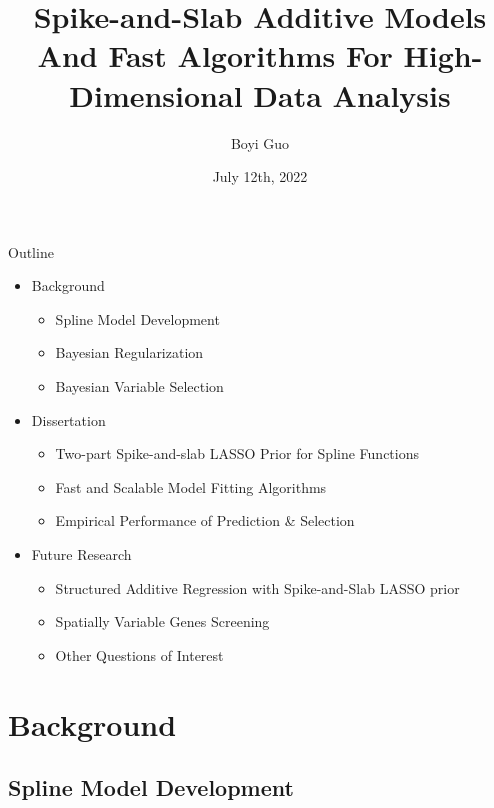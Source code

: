 \documentclass[
  ignorenonframetext,
  aspectratio=169]{beamer}
\title{Spike-and-Slab Additive Models And Fast Algorithms For
High-Dimensional Data Analysis}
\author{Boyi Guo}
\date{July 12th, 2022}
\institute{Department of Biostatistics\\
University of Alabama at Birmingham}
\providecommand{\tightlist}{%
  \setlength{\itemsep}{0pt}\setlength{\parskip}{0pt}}
\begin{document}
\frame{\titlepage}


\begin{frame}{Outline}
\begin{itemize}
\tightlist
\item
  Background

  \begin{itemize}
  \tightlist
  \item
    Spline Model Development
  \item
    Bayesian Regularization
  \item
    Bayesian Variable Selection
  \end{itemize}
\item
  Dissertation

  \begin{itemize}
  \tightlist
  \item
    Two-part Spike-and-slab LASSO Prior for Spline Functions
  \item
    Fast and Scalable Model Fitting Algorithms
  \item
    Empirical Performance of Prediction \& Selection
  \end{itemize}
\item
  Future Research

  \begin{itemize}
  \tightlist
  \item
    Structured Additive Regression with Spike-and-Slab LASSO prior
  \item
    Spatially Variable Genes Screening
  \item
    Other Questions of Interest
  \end{itemize}
\end{itemize}
\end{frame}

\hypertarget{background}{%
\section{Background}\label{background}}

\hypertarget{spline-model-development}{%
\subsection{Spline Model Development}\label{spline-model-development}}
\end{document}
